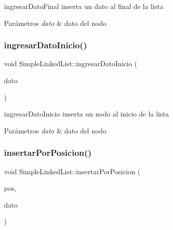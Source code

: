 ingresar\+Dato\+Final inserta un dato al final de la lista 


\begin{DoxyParams}{Parámetros}
{\em dato} & dato del nodo \\
\hline
\end{DoxyParams}
\mbox{\label{class_simple_linked_list_aef2841b155c31147e5932c13302f39c4}} 
\subsubsection{\texorpdfstring{ingresar\+Dato\+Inicio()}{ingresarDatoInicio()}}
{\footnotesize\ttfamily void Simple\+Linked\+List\+::ingresar\+Dato\+Inicio (\begin{DoxyParamCaption}\item[{Q\+String}]{dato }\end{DoxyParamCaption})\hspace{0.3cm}{\ttfamily [inline]}}



ingresar\+Dato\+Inicio inserta un nodo al inicio de la lista 


\begin{DoxyParams}{Parámetros}
{\em dato} & dato del nodo \\
\hline
\end{DoxyParams}
\mbox{\label{class_simple_linked_list_aac2d1b432374ecbc20e8d9c5ba738fa7}} 
\subsubsection{\texorpdfstring{insertar\+Por\+Posicion()}{insertarPorPosicion()}}
{\footnotesize\ttfamily void Simple\+Linked\+List\+::insertar\+Por\+Posicion (\begin{DoxyParamCaption}\item[{int}]{pos,  }\item[{Q\+String}]{dato }\end{DoxyParamCaption})\hspace{0.3cm}{\ttfamily [inline]}}




